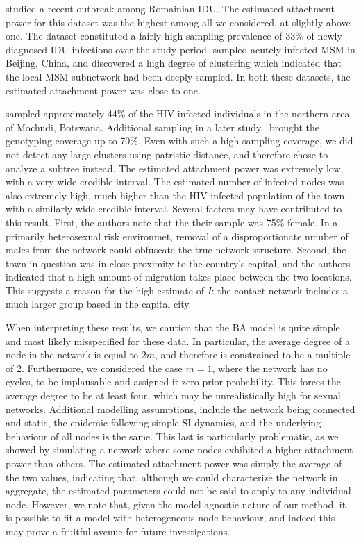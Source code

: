 \documentclass[12pt]{article}\usepackage[]{graphicx}\usepackage[]{color}
\begin{document}
\textcite{niculescu2015recent} studied a recent outbreak among Romainian
\gls{IDU}. The estimated attachment power for this dataset was the highest
among all we considered, at slightly above one. The dataset constituted a
fairly high sampling prevalence of 33\% of newly diagnosed \gls{IDU} infections
over the study period. \textcite{wang2015targeting} sampled acutely infected
\gls{MSM} in Beijing, China, and discovered a high degree of clustering which
indicated that the local \gls{MSM} subnetwork had been deeply sampled. In both
these datasets, the estimated attachment power was close to one.

\textcite{novitsky2013phylogenetic} sampled approximately 44\% of the
HIV-infected individuals in the northern area of Mochudi, Botswana. Additional
sampling in a later study~\autocite{novitsky2014impact} brought the genotyping
coverage up to 70\%. Even with such a high sampling coverage, we did not detect
any large clusters using patristic distance, and therefore chose to analyze a
subtree instead. The estimated attachment power was extremely low, with a very
wide credible interval. The estimated number of infected nodes was also
extremely high, much higher than the HIV-infected population of the town, with
a similarly wide credible interval. Several factors may have contributed to
this result. First, the authors note that the their sample was 75\% female. In
a primarily heterosexual risk environmet, removal of a disproportionate nmuber
of males from the network could obfuscate the true network structure. Second,
the town in question was in close proximity to the country's capital, and the
authors indicated that a high amount of migration takes place between the two
locations. This suggests a reason for the high estimate of $I$: the contact
network includes a much larger group based in the capital city.

When interpreting these results, we caution that the \gls{BA} model is quite
simple and most likely misspecified for these data. In particular, the average
degree of a node in the network is equal to $2m$, and therefore is constrained
to be a multiple of 2. Furthermore, we considered the case $m = 1$, where the
network has no cycles, to be implausable and assigned it zero prior
probability. This forces the average degree to be at least four, which may be
unrealistically high for sexual networks. Additional modelling assumptions,
include the network being connected and static, the epidemic following simple
\gls{SI} dynamics, and the underlying behaviour of all nodes is the same. This
last is particularly problematic, as we showed by simulating a network where
some nodes exhibited a higher attachment power than others. The estimated
attachment power was simply the average of the two values, indicating that,
although we could characterize the network in aggregate, the estimated
parameters could not be said to apply to any individual node. However, we note
that, given the model-agnostic nature of our method, it is possible to fit a
model with heterogeneous node behaviour, and indeed this may prove a fruitful
avenue for future investigations.
\end{document}
